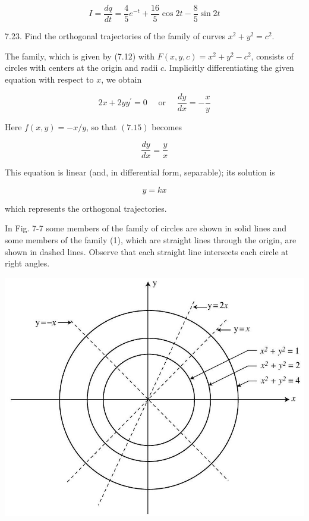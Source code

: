 \documentclass[10pt]{article}
\begin{document}
$$
I=\frac{d q}{d t}=\frac{4}{5} e^{-t}+\frac{16}{5} \cos 2 t-\frac{8}{5} \sin 2 t
$$

7.23. Find the orthogonal trajectories of the family of curves $x^{2}+y^{2}=c^{2}$.

The family, which is given by (7.12) with $F(x, y, c)=x^{2}+y^{2}-c^{2}$, consists of circles with centers at the origin and radii $c$. Implicitly differentiating the given equation with respect to $x$, we obtain

$$
2 x+2 y y^{\prime}=0 \quad \text { or } \quad \frac{d y}{d x}=-\frac{x}{y}
$$

Here $f(x, y)=-x / y$, so that $(7.15)$ becomes

$$
\frac{d y}{d x}=\frac{y}{x}
$$

This equation is linear (and, in differential form, separable); its solution is


\begin{equation*}
y=k x \tag{1}
\end{equation*}


which represents the orthogonal trajectories.

In Fig. 7-7 some members of the family of circles are shown in solid lines and some members of the family (1), which are straight lines through the origin, are shown in dashed lines. Observe that each straight line intersects each circle at right angles.

\begin{center}
\includegraphics[max width=\textwidth]{2024_04_03_5bb5b4275a64cb9887d1g-085}
\end{center}
\end{document}
